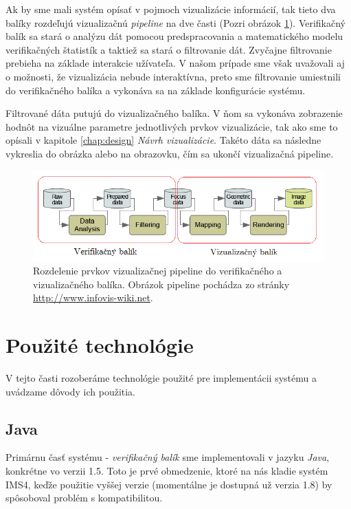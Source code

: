 Ak by sme mali systém opísať v pojmoch vizualizácie informácií, tak tieto dva balíky rozdeľujú vizualizačnú \textit{pipeline} na dve časti (Pozri obrázok \ref{fig:pipeline}). Verifikačný balík sa stará o analýzu dát pomocou predspracovania a matematického modelu verifikačných štatistík a taktiež sa stará o filtrovanie dát. Zvyčajne filtrovanie prebieha na základe interakcie užívateľa. V našom prípade sme však uvažovali aj o možnosti, že vizualizácia nebude interaktívna, preto sme filtrovanie umiestnili do verifikačného balíka a vykonáva sa na základe konfigurácie systému. 

Filtrované dáta putujú do vizualizačného balíka. V ňom sa vykonáva zobrazenie hodnôt na vizuálne parametre jednotlivých prvkov vizualizácie, tak ako sme to opísali v kapitole \ref{chap:design} \textit{Návrh vizualizácie}. Takéto dáta sa následne vykreslia do obrázka alebo na obrazovku, čím sa ukončí vizualizačná pipeline.


\begin{figure}
	\centering
	\includegraphics[width = 6in]{pipeline}
	\caption{Rozdelenie prvkov vizualizačnej pipeline do verifikačného a vizualizačného balíka. Obrázok pipeline pochádza zo stránky \protect\url{http://www.infovis-wiki.net}.}
	\label{fig:pipeline} 
\end{figure}

\section{Použité technológie}
V tejto časti rozoberáme technológie použité pre implementácii systému a uvádzame dôvody ich použitia.

\subsection{Java}
Primárnu časť systému - \textit{verifikačný balík} sme implementovali v jazyku \textit{Java}, konkrétne vo verzii 1.5. Toto je prvé obmedzenie, ktoré na nás kladie systém IMS4, keďže použitie vyššej verzie (momentálne je dostupná už verzia 1.8) by spôsoboval problém s kompatibilitou.

